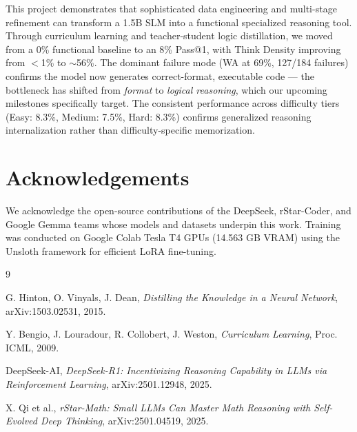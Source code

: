 \documentclass[preprint,12pt]{elsarticle}
\begin{document}
This project demonstrates that sophisticated data engineering and multi-stage refinement can transform a 1.5B SLM into a functional specialized reasoning tool. Through curriculum learning and teacher-student logic distillation, we moved from a 0\% functional baseline to an 8\% Pass@1, with Think Density improving from $<$1\% to $\sim$56\%. The dominant failure mode (WA at 69\%, 127/184 failures) confirms the model now generates correct-format, executable code — the bottleneck has shifted from \textit{format} to \textit{logical reasoning}, which our upcoming milestones specifically target. The consistent performance across difficulty tiers (Easy: 8.3\%, Medium: 7.5\%, Hard: 8.3\%) confirms generalized reasoning internalization rather than difficulty-specific memorization.

\section*{Acknowledgements}

We acknowledge the open-source contributions of the DeepSeek, rStar-Coder, and Google Gemma teams whose models and datasets underpin this work. Training was conducted on Google Colab Tesla T4 GPUs (14.563 GB VRAM) using the Unsloth framework for efficient LoRA fine-tuning.

\begin{thebibliography}{9}

    G. Hinton, O. Vinyals, J. Dean,
    \textit{Distilling the Knowledge in a Neural Network},
    arXiv:1503.02531, 2015.

    Y. Bengio, J. Louradour, R. Collobert, J. Weston,
    \textit{Curriculum Learning},
    Proc. ICML, 2009.

    DeepSeek-AI,
    \textit{DeepSeek-R1: Incentivizing Reasoning Capability in LLMs via Reinforcement Learning},
    arXiv:2501.12948, 2025.

    X. Qi et al.,
    \textit{rStar-Math: Small LLMs Can Master Math Reasoning with Self-Evolved Deep Thinking},
    arXiv:2501.04519, 2025.

\end{thebibliography}
\end{document}
